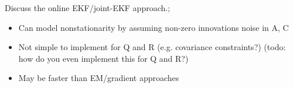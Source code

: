 \documentclass{article}
\begin{document}
Discuss the online EKF/joint-EKF approach.; \begin{itemize}
    \item Can model nonstationarity by assuming non-zero innovations noise in A, C
    \item Not simple to implement for Q and R (e.g. covariance constraints?) (todo: how do you even implement this for Q and R?)
    \item May be faster than EM/gradient approaches
\end{itemize}
\end{document}
